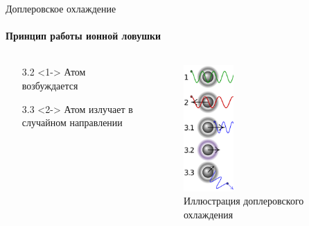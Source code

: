 \documentclass{beamer}
\begin{document}
    \begin{frame}{Доплеровское охлаждение}
    \framesubtitle{Принцип работы ионной ловушки}
        \begin{columns}

        \begin{column}{0.5\textwidth}

            \begin{itemize}
                \item[3.2] <1-> Атом возбуждается
                \item[3.3] <2-> Атом излучает в случайном направлении
            \end{itemize}

        \end{column}

        \begin{column}{0.5\textwidth}
            \begin{figure}
                \centering
                \includegraphics[width=0.35\textwidth]{media/dopler-cooling.png}
                \caption{Иллюстрация доплеровского охлаждения}
            \end{figure}
        \end{column}

        \end{columns}

    \end{frame}


\end{document}
